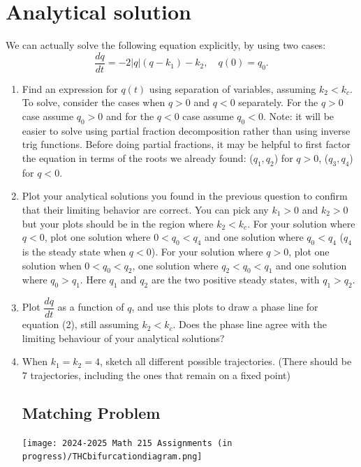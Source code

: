 \documentclass[10pt, letterpaper, answer]{exam}
\begin{document}
 \section{Analytical solution}
We can actually solve the following equation explicitly, by using two cases:
\begin{equation}
    \dfrac{dq}{dt} = -2|q|(q - k_1) - k_2, \quad q(0)=q_0.\label{eq:q}
\end{equation}
\begin{enumerate}
    \item Find an expression for $q(t)$ using separation of variables, assuming $k_2<k_c$. To solve, consider the cases when $q>0$ and $q<0$ separately. For the $q>0$ case assume $q_0>0$ and for the $q<0$ case assume $q_0<0$. Note: it will be easier to solve using partial fraction decomposition rather than using inverse trig functions. Before doing partial fractions, it may be helpful to first factor the equation in terms of the roots we already found: ($q_1, q_2$) for $q>0$, ($q_3, q_4$) for $q<0$. 
  

    \item Plot your analytical solutions you found in the previous question to confirm that their limiting behavior are correct. You can pick any $k_1>0$ and $k_2>0$ but your plots should be in the region where $k_2<k_c$. For your solution where $q<0$, plot one solution where $0<q_0<q_4$ and one solution where $q_0<q_4$ ($q_4$ is the steady state when $q<0$). For your solution where $q>0$, plot one solution when $0<q_0<q_2$, one solution where $q_2<q_0<q_1$ and one solution where $q_0>q_1$. Here $q_1$ and $q_2$ are the two positive steady states, with $q_1>q_2$.


    
    \item Plot $\dfrac{dq}{dt}$ as a function of $q$, and use this plots to draw a phase line for equation (2), still assuming $k_2<k_c$. Does the phase line agree with the limiting behaviour of your analytical solutions? 
    \item When $k_1 = k_2 = 4$, sketch all different possible trajectories. (There should be 7 trajectories, including the ones that remain on a fixed point)
\subsection{Matching Problem}
\texttt{[image: 2024-2025 Math 215 Assignments (in progress)/THCbifurcationdiagram.png]} \\


\end{enumerate}
\end{document}
